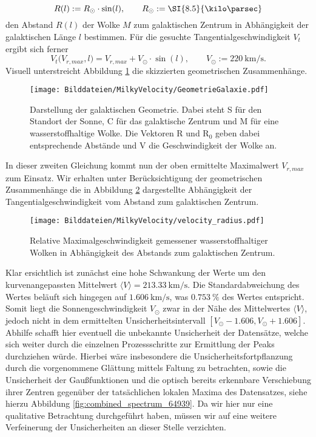 \documentclass[../../main.tex]{subfiles}
\begin{document}
    \[
        R(l) := R_{\odot}\cdot\sin(l), \qquad R_{\odot} := \SI{8.5}{\kilo\parsec}
    \]
    den Abstand $R(l)$ der Wolke $M$ zum galaktischen Zentrum in Abhängigkeit der galaktischen Länge $l$ bestimmen. 
    Für die gesuchte Tangentialgeschwindigkeit $V_t$ ergibt sich ferner
    \[
        V_t\bigl(V_{r,max},l\bigr) = V_{r,max} + V_{\odot}\cdot\sin(l), \qquad V_{\odot} := \SI{220}{\kilo\meter\per\second}.
    \] 
    Visuell unterstreicht Abbildung \ref{fig:GeometrieGalaxie} die skizzierten geometrischen Zusammenhänge.
    \begin{figure}[H]
        \centering
        \texttt{[image: Bilddateien/MilkyVelocity/GeometrieGalaxie.pdf]}
        \caption{Darstellung der galaktischen Geometrie. Dabei steht S für den Standort der Sonne, C für das galaktische Zentrum und M für eine wasserstoffhaltige Wolke. Die Vektoren R und $\text{R}_0$ geben dabei entsprechende Abstände und V die Geschwindigkeit der Wolke an.}
        \label{fig:GeometrieGalaxie}
    \end{figure}
    In dieser zweiten Gleichung kommt nun der oben ermittelte Maximalwert $V_{r,max}$ zum Einsatz. Wir erhalten unter Berücksichtigung der geometrischen Zusammenhänge die in Abbildung \ref{fig:velocity_radius} dargestellte Abhängigkeit der Tangentialgeschwindigkeit vom Abstand zum galaktischen Zentrum.
    \begin{figure}[H]
        \centering
        \texttt{[image: Bilddateien/MilkyVelocity/velocity\_radius.pdf]}
        \caption{Relative Maximalgeschwindigkeit gemessener wasserstoffhaltiger Wolken in Abhängigkeit des Abstands zum galaktischen Zentrum.}
        \label{fig:velocity_radius}
    \end{figure}
    Klar ersichtlich ist zunächst eine hohe Schwankung der Werte um den kurvenangepassten Mittelwert $\langle V\rangle = \SI{213.33}{\km\per\s}$. Die Standardabweichung des Wertes beläuft sich hingegen auf $\SI{1.606}{\km\per\s}$, was $\SI{0.753}{\percent}$ des Wertes entspricht. Somit liegt die Sonnengeschwindigkeit $V_{\odot}$ zwar in der Nähe des Mittelwertes $\langle V\rangle$, jedoch nicht in dem ermittelten Unsicherheitsintervall $[V_\odot - 1.606,V_\odot + 1.606]$. Abhilfe schafft hier eventuell die unbekannte Unsicherheit der Datensätze, welche sich weiter durch die einzelnen Prozessschritte zur Ermittlung der Peaks durchziehen würde. Hierbei wäre insbesondere die Unsicherheitsfortpflanzung durch die vorgenommene Glättung mittels Faltung zu betrachten, sowie die Unsicherheit der Gaußfunktionen und die optisch bereits erkennbare Verschiebung ihrer Zentren gegenüber der tatsächlichen lokalen Maxima des Datensatzes, siehe hierzu Abbildung \ref{fig:combined_spectrum_64939}. Da wir hier nur eine qualitative Betrachtung durchgeführt haben, müssen wir auf eine weitere Verfeinerung der Unsicherheiten an dieser Stelle verzichten. 
\end{document}
